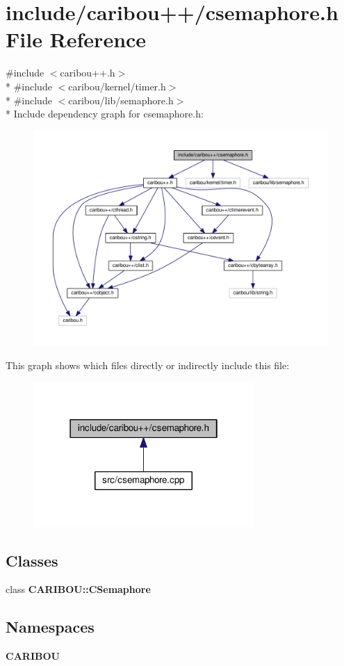 \section{include/caribou++/csemaphore.h File Reference}
\label{csemaphore_8h}
{\ttfamily \#include $<$caribou++.\+h$>$}\\*
{\ttfamily \#include $<$caribou/kernel/timer.\+h$>$}\\*
{\ttfamily \#include $<$caribou/lib/semaphore.\+h$>$}\\*
Include dependency graph for csemaphore.\+h\+:
\nopagebreak
\begin{figure}[H]
\begin{center}
\leavevmode
\includegraphics[width=350pt]{csemaphore_8h__incl}
\end{center}
\end{figure}
This graph shows which files directly or indirectly include this file\+:
\nopagebreak
\begin{figure}[H]
\begin{center}
\leavevmode
\includegraphics[width=238pt]{csemaphore_8h__dep__incl}
\end{center}
\end{figure}
\subsection*{Classes}
\begin{DoxyCompactItemize}
\item 
class {\bf C\+A\+R\+I\+B\+O\+U\+::\+C\+Semaphore}
\end{DoxyCompactItemize}
\subsection*{Namespaces}
\begin{DoxyCompactItemize}
\item 
 {\bf C\+A\+R\+I\+B\+OU}
\end{DoxyCompactItemize}

